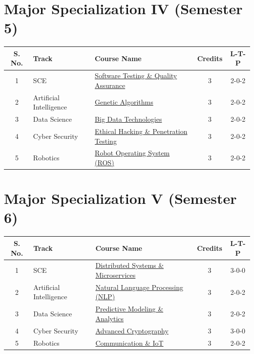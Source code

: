 \label{table:major4}
\section*{Major Specialization IV (Semester 5)}
\begin{longtable}{|c|l|p{7cm}|c|c|}
\hline
\textbf{S. No.} & \textbf{Track} & \textbf{Course Name} & \textbf{Credits} & \textbf{L-T-P} \\
\hline
1 & SCE & \hyperref[major:SE_4]{Software Testing \& Quality Assurance} & 3 & 2-0-2 \\
\hline
2 & Artificial Intelligence & \hyperref[major:ML_4]{Genetic Algorithms} & 3 & 2-0-2 \\
\hline
3 & Data Science & \hyperref[major:DS_4]{Big Data Technologies} & 3 & 2-0-2 \\
\hline
4 & Cyber Security & \hyperref[major:CS_4]{Ethical Hacking \& Penetration Testing} & 3 & 2-0-2 \\
\hline
5 & Robotics & \hyperref[major:RB_4]{Robot Operating System (ROS)} & 3 & 2-0-2 \\
\hline
\end{longtable}

\newpage
\label{table:major5}
\section*{Major Specialization V (Semester 6)}
\begin{longtable}{|c|l|p{7cm}|c|c|}
\hline
\textbf{S. No.} & \textbf{Track} & \textbf{Course Name} & \textbf{Credits} & \textbf{L-T-P} \\
\hline
1 & SCE & \hyperref[major:SE_5]{Distributed Systems \& Microservices} & 3 & 3-0-0 \\
\hline
2 & Artificial Intelligence & \hyperref[major:ML_5]{Natural Language Processing (NLP)} & 3 & 2-0-2 \\
\hline
3 & Data Science & \hyperref[major:DS_5]{Predictive Modeling \& Analytics} & 3 & 2-0-2 \\
\hline
4 & Cyber Security & \hyperref[major:CS_5]{Advanced Cryptography} & 3 & 3-0-0 \\
\hline
5 & Robotics & \hyperref[major:RB_5]{Communication \& IoT} & 3 & 2-0-2 \\
\hline
\end{longtable}

